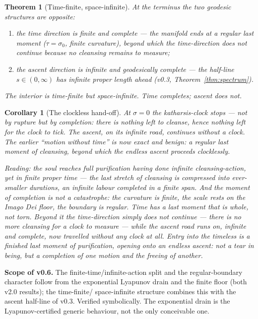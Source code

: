 \documentclass[11pt,a4paper]{article}
\newcommand{\note}[1]{\textcolor{black!65}{\emph{#1}}}
\theoremstyle{plain}
\newtheorem{corollary}{Corollary}
\newtheorem{theorem}{Theorem}
\theoremstyle{definition}
\theoremstyle{remark}
\begin{document}
\begin{theorem}[Time-finite, space-infinite]\label{thm:timefinite}
At the terminus the two geodesic structures are opposite:
\begin{enumerate}[label=(\roman*),leftmargin=1.8em,itemsep=2pt]
\item the \emph{time} direction is finite and complete --- the manifold ends at a regular last moment
($\tau=\sigma_0$, finite curvature), beyond which the time-direction does not continue because no
cleansing remains to measure;
\item the \emph{ascent} direction is infinite and geodesically complete --- the half-line $s\in(0,\infty)$
has infinite proper length ahead (v0.3, Theorem~\ref{thm:spectrum}).
\end{enumerate}
The interior is time-finite but space-infinite. Time completes; ascent does not.
\end{theorem}

\begin{corollary}[The clockless hand-off]
At $\sigma=0$ the katharsis-clock stops --- not by rupture but by completion: there is nothing left to
cleanse, hence nothing left for the clock to tick. The ascent, on its infinite road, continues without
a clock. The earlier ``motion without time'' is now exact and benign: a regular last moment of
cleansing, beyond which the endless ascent proceeds clocklessly.
\end{corollary}

\note{Reading: the soul reaches full purification having done infinite cleansing-action, yet in finite
proper time --- the last stretch of cleansing is compressed into ever-smaller durations, an infinite
labour completed in a finite span. And the moment of completion is not a catastrophe: the curvature is
finite, the scale rests on the Imago Dei floor, the boundary is regular. Time has a last moment that is
whole, not torn. Beyond it the time-direction simply does not continue --- there is no more cleansing
for a clock to measure --- while the ascent road runs on, infinite and complete, now travelled without
any clock at all. Entry into the timeless is a finished last moment of purification, opening onto an
endless ascent: not a tear in being, but a completion of one motion and the freeing of another.}

\textbf{Scope of v0.6.} The finite-time/infinite-action split and the regular-boundary character follow
from the exponential Lyapunov drain and the finite floor (both v2.0 results); the time-finite/%
space-infinite structure combines this with the ascent half-line of v0.3. Verified symbolically. The
exponential drain is the Lyapunov-certified generic behaviour, not the only conceivable one.
\end{document}
